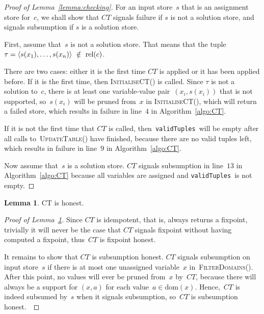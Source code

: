 \documentclass[a4paper,11pt]{article}
\theoremstyle{definition}
\newtheorem{lemma}[theorem]{Lemma}
\newcommand{\Algoref}[1]{Algorithm~\ref{#1}}
\newcommand{\Lemmaref}[1]{Lemma~\ref{#1}}
\newcommand{\Dom}[1]{\text{dom}({#1})}
\newcommand{\Relation}[1]{\text{rel}({#1})}
\newcommand{\CurrTable}{\texttt{validTuples}}
\def\UpdateTable{\textsc{Update\-Table}}
\def\FilterDomains{\textsc{Filter\-Domains}}
\def\InitialiseCT{\textsc{Initialise\-CT}}
\numberwithin{equation}{section}
\begin{document}
\begin{sloppypar}
\begin{proof}[Proof of \Lemmaref{lemma:checking}]
  For an input store~$s$ that is an assignment store for~$c$,
  we shall show that $CT$
  signals failure if $s$ is not a solution store, and signals subsumption if
  $s$ is a solution store.

  First, assume that~$s$ is not a solution store. That means that the tuple
  $\tau = \Tuple{s(x_1),\ldots,s(x_n)}~\notin~\Relation{c}$.

  There are two cases: either
  it is the first time $CT$ is applied or it has been applied before.
  If it is the first time, then \InitialiseCT() is called.
  Since $\tau$ is not a solution to~$c$, there is at least one variable-value
  pair~$(x_i,s(x_i))$ that is not supported, so~$s(x_i)$ will be pruned
  from~$x$ in \InitialiseCT(), which will return a failed store, which results
  in failure in line~$4$ in \Algoref{algo:CT}.

  If it is not the first time that $CT$ is called, then~\CurrTable~will be empty
  after all calls to~\UpdateTable() have finished, because there are no
  valid tuples left, which results in failure in line~$9$ in \Algoref{algo:CT}.

  Now assume that~$s$ is a solution store.
  $CT$ signals subsumption in line~$13$ in \Algoref{algo:CT} because all
  variables are assigned and \CurrTable~is not empty.
\end{proof}
\end{sloppypar}

\begin{lemma}\label{lemma:honest}
  CT is honest.
\end{lemma}

\begin{proof}[Proof of \Lemmaref{lemma:honest}]
  Since $CT$ is idempotent, that is, always returns a fixpoint,
  trivially it will never be the case that
  $CT$ signals fixpoint without having computed a fixpoint, thus~$CT$ is
  fixpoint honest.

  It remains to show that $CT$ is subsumption honest.
  $CT$ signals subsumption on input store~$s$ if there is at most one
  unassigned variable~$x$ in~\FilterDomains(). After this point, no values will
  ever be pruned from~$x$ by~$CT$, because there will always be a support for
  $(x,a)$ for each value~$a \in \Dom{x}$. Hence,~$CT$ is indeed subsumed by~$s$
  when it signals subsumption, so~$CT$ is subsumption honest.~\end{proof}
\end{document}
